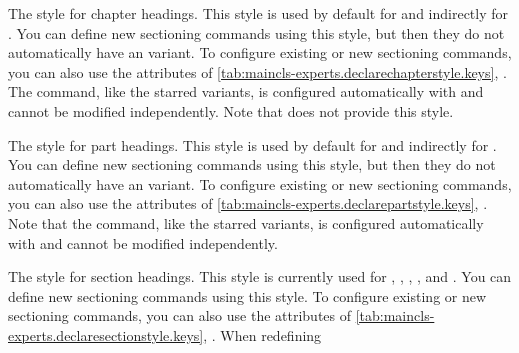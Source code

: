 \begin{description}
\item[\PValue{chapter}:] The style for chapter headings. This style is used by
  default for  and indirectly
  for . You can define new
  sectioning commands using this style, but then they do not automatically
  have an  variant. To configure existing or new sectioning
  commands, you can also use the attributes of
  \autoref{tab:maincls-experts.declarechapterstyle.keys},
  .
  The  command,
  like the starred variants, is configured automatically with
   and cannot be modified independently. Note
  that  does not
  provide this style.
\item[\PValue{part}:] The style for part headings. This
  style is used by default for  and
  indirectly for . You can
  define new sectioning commands using this style, but then they do not
  automatically have an  variant. To configure existing or new
  sectioning commands, you can also use the attributes of
  \autoref{tab:maincls-experts.declarepartstyle.keys},
  .
  Note that the  command,
  like the starred variants, is configured automatically with
   and cannot be modified independently.
\item[\PValue{section}:] The style for section headings. This style is currently
  used for ,
  ,
  ,
  , and
  . You can define
  new sectioning commands using this style. To configure existing or new
  sectioning commands, you can also use the attributes of
  \autoref{tab:maincls-experts.declaresectionstyle.keys},
  . When redefining

\end{description}
